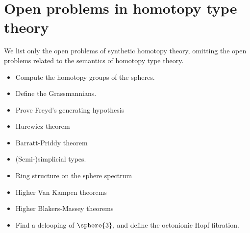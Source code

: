 \chapter{Open problems in homotopy type theory}
We list only the open problems of synthetic homotopy theory, omitting the open problems related to the semantics of homotopy type theory.
\begin{itemize}
\item Compute the homotopy groups of the spheres.
\item Define the Grassmannians.
\item Prove Freyd's generating hypothesis
\item Hurewicz theorem
\item Barratt-Priddy theorem
\item (Semi-)simplicial types.
\item Ring structure on the sphere spectrum
\item Higher Van Kampen theorems
\item Higher Blakers-Massey theorems
\item Find a delooping of $\sphere{3}$, and define the octonionic Hopf fibration.
\end{itemize}
